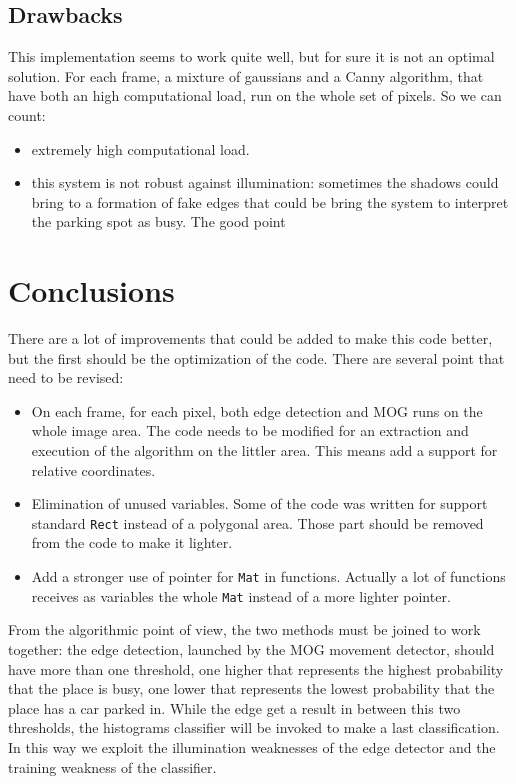 	\subsection{Drawbacks}

	This implementation seems to work quite well, but for sure it is not an optimal
	solution. For each frame, a mixture of gaussians and a Canny algorithm, that
	have both an high computational load, run on the whole set of pixels. So we can
	count:
	\begin{itemize}
	  \item extremely high computational load.
	  \item this system is not robust against illumination: sometimes the shadows
	  could bring to a formation of fake edges that could be bring the system to
	  interpret the parking spot as busy. The good point 
	\end{itemize}
	
\section{Conclusions}

	There are a lot of improvements that could be added to make this code better,
	but the first should be the optimization of the code. There are several point
	that need to be revised:
	\begin{itemize}
	  \item On each frame, for each pixel, both edge detection and MOG runs on the
	  whole image area. The code needs to be modified for an extraction
	  and execution of the algorithm on the littler area. This means add a support
	  for relative coordinates.
	  \item Elimination of unused variables. Some of the code was written for
	  support standard \verb+Rect+ instead of a polygonal area. Those part should
	  be removed from the code to make it lighter.
	  \item Add a stronger use of pointer for \verb+Mat+ in functions. Actually a
	  lot of functions receives as variables the whole \verb+Mat+ instead of a more
	  lighter pointer.
	\end{itemize}
	From the algorithmic point of view, the two methods must be joined to work
	together: the edge detection, launched by the MOG movement detector, should
	have more than one threshold, one higher that represents the highest
	probability that the place is busy, one lower that represents the lowest
	probability that the place has a car parked in. While the edge get a result in
	between this two thresholds, the histograms classifier will be invoked to make
	a last classification. In this way we exploit the illumination weaknesses of
	the edge detector and the training weakness of the classifier.
	
